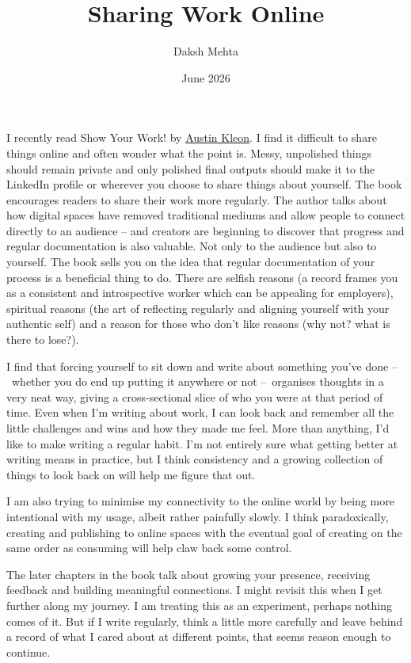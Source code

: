 \documentclass{article}
\title{Sharing Work Online}
\date{June 2026}
\author{Daksh Mehta}
\begin{document}
I recently read Show Your Work! by \href{https://austinkleon.com}{Austin Kleon}. I find it difficult to share things online and often wonder what the point is. Messy, unpolished things should remain private and only polished final outputs should make it to the LinkedIn profile or wherever you choose to share things about yourself. The book encourages readers to share their work more regularly. The author talks about how digital spaces have removed traditional mediums and allow people to connect directly to an audience – and creators are beginning to discover that progress and regular documentation is also valuable. Not only to the audience but also to yourself. The book sells you on the idea that regular documentation of your process is a beneficial thing to do. There are selfish reasons (a record frames you as a consistent and introspective worker which can be appealing for employers), spiritual reasons (the art of reflecting regularly and aligning yourself with your authentic self) and a reason for those who don't like reasons (why not? what is there to lose?). 

I find that forcing yourself to sit down and write about something you've done – whether you do end up putting it anywhere or not – organises thoughts in a very neat way, giving a cross-sectional slice of who you were at that period of time. Even when I'm writing about work, I can look back and remember all the little challenges and wins and how they made me feel. More than anything, I’d like to make writing a regular habit. I’m not entirely sure what getting better at writing means in practice, but I think consistency and a growing collection of things to look back on will help me figure that out.

I am also trying to minimise my connectivity to the online world by being more intentional with my usage, albeit rather painfully slowly. I think paradoxically, creating and publishing to online spaces with the eventual goal of creating on the same order as consuming will help claw back some control. 

The later chapters in the book talk about growing your presence, receiving feedback and building meaningful connections. I might revisit this when I get further along my journey. I am treating this as an experiment, perhaps nothing comes of it. But if I write regularly, think a little more carefully and leave behind a record of what I cared about at different points, that seems reason enough to continue. 
\end{document}
